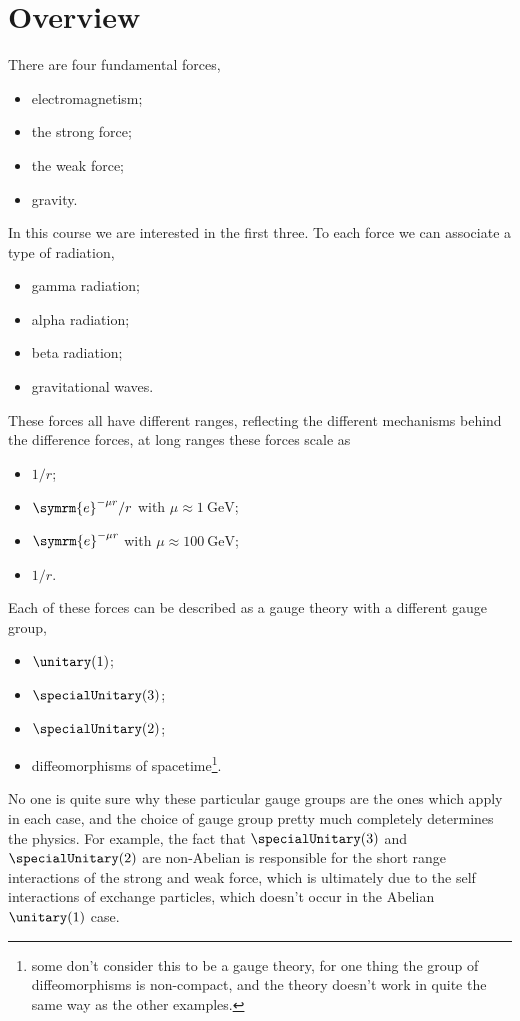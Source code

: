 \documentclass[fleqn]{NotesClass}
\newcommand{\e}{\symrm{e}}
\begin{document}
    \chapter{Overview}
    There are four fundamental forces,
    \begin{itemize}
        \item electromagnetism;
        \item the strong force;
        \item the weak force;
        \item gravity.
    \end{itemize}
    In this course we are interested in the first three.
    To each force we can associate a type of radiation,
    \begin{itemize}
        \item gamma radiation;
        \item alpha radiation;
        \item beta radiation;
        \item gravitational waves.
    \end{itemize}
    These forces all have different ranges, reflecting the different mechanisms behind the difference forces, at long ranges these forces scale as
    \begin{itemize}
        \item \(1/r\);
        \item \(\e^{-\mu r}/r\) with \(\mu \approx \qty{1}{\giga\electronvolt}\);
        \item \(\e^{-\mu r}\) with \(\mu \approx \qty{100}{\giga\electronvolt}\);
        \item \(1/r\).
    \end{itemize}
    Each of these forces can be described as a gauge theory with a different gauge group,
    \begin{itemize}
        \item \(\unitary(1)\);
        \item \(\specialUnitary(3)\);
        \item \(\specialUnitary(2)\);
        \item diffeomorphisms of spacetime\footnote{some don't consider this to be a gauge theory, for one thing the group of diffeomorphisms is non-compact, and the theory doesn't work in quite the same way as the other examples.}.
    \end{itemize}
    No one is quite sure why these particular gauge groups are the ones which apply in each case, and the choice of gauge group pretty much completely determines the physics.
    For example, the fact that \(\specialUnitary(3)\) and \(\specialUnitary(2)\) are non-Abelian is responsible for the short range interactions of the strong and weak force, which is ultimately due to the self interactions of exchange particles, which doesn't occur in the Abelian \(\unitary(1)\) case.
    
\end{document}
